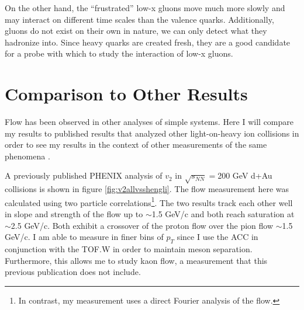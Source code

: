 On the other hand, the ``frustrated'' low-x gluons move much more slowly and may interact on different time scales than the valence quarks. Additionally, gluons do not exist on their own in nature, we can only detect what they hadronize into. Since heavy quarks are created fresh, they are a good candidate for a probe with which to study the interaction of low-x gluons.

\section{Comparison to Other Results}
Flow has been observed in other analyses of simple systems. Here I will compare my results to published results that analyzed other light-on-heavy ion collisions in order to see my results in the context of other measurements of the same phenomena . 

A previously published PHENIX analysis of $v_2$ in $\sqrt{s_{NN}}=$200 GeV d+Au collisions is shown in figure \ref{fig:v2allvsshengli}. The flow measurement here was calculated using two particle correlations\footnote{In contrast, my measurement uses a direct Fourier analysis of the flow.}. The two results track each other well in slope and strength of the flow up to $\sim$1.5 GeV/c and both reach saturation at $\sim$2.5 GeV/c. Both exhibit a crossover of the proton flow over the pion flow $\sim$1.5 GeV/c. I am able to measure in finer bins of $p_T$ since I use the ACC in conjunction with the TOF.W in order to maintain meson separation.  Furthermore, this allows me to study kaon flow, a measurement that this previous publication does not include.

